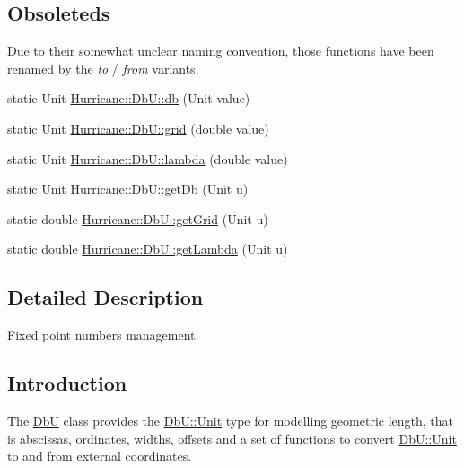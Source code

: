 \subsection*{Obsoleteds}
\label{_amgrpf05125b8b6a468721054b36b1a1cfd62}%
 Due to their somewhat unclear naming convention, those functions have been renamed by the {\itshape to} / {\itshape from} variants. \begin{DoxyCompactItemize}
\item 
static Unit \hyperlink{group__DbUGroup_gacd77957381fb93fc4203bdca215e0b48}{Hurricane\-::\-Db\-U\-::db} (Unit value)
\item 
static Unit \hyperlink{group__DbUGroup_ga1d4bac6e3b68c8cd44b345de3b425753}{Hurricane\-::\-Db\-U\-::grid} (double value)
\item 
static Unit \hyperlink{group__DbUGroup_gaa1ba98acc939ff1c370c18544a5e0dce}{Hurricane\-::\-Db\-U\-::lambda} (double value)
\item 
static Unit \hyperlink{group__DbUGroup_ga4233772b1b3e68f3ec723c7509ea87ff}{Hurricane\-::\-Db\-U\-::get\-Db} (Unit u)
\item 
static double \hyperlink{group__DbUGroup_gad4485d0d7b5fd7ae87b32f165155c0a2}{Hurricane\-::\-Db\-U\-::get\-Grid} (Unit u)
\item 
static double \hyperlink{group__DbUGroup_gadea6b9a6e84243f70f3a5e2725b2c6d8}{Hurricane\-::\-Db\-U\-::get\-Lambda} (Unit u)
\end{DoxyCompactItemize}


\subsection{Detailed Description}
Fixed point numbers management. \hypertarget{group__DbUGroup_secDbUIntro}{}\subsection{Introduction}\label{group__DbUGroup_secDbUIntro}
The \hyperlink{classHurricane_1_1DbU}{Db\-U} class provides the \hyperlink{group__DbUGroup_ga4fbfa3e8c89347af76c9628ea06c4146}{Db\-U\-::\-Unit} type for modelling geometric length, that is abscissas, ordinates, widths, offsets and a set of functions to convert \hyperlink{group__DbUGroup_ga4fbfa3e8c89347af76c9628ea06c4146}{Db\-U\-::\-Unit} to and from external coordinates.

